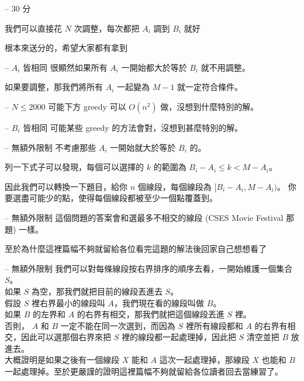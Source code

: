 \documentclass[hyperref,UTF8,notheorems,xcolor={dvipsnames}]{beamer}
\newcommand{\btitle}[1]{{\secname} -- #1}
\theoremstyle{definition}
\begin{document}
\begin{frame}[fragile]{\btitle{30 分}}
	
	我們可以直接花 $N$ 次調整，每次都把 $A_i$ 調到 $B_i$ 就好
	\pause

	根本來送分的，希望大家都有拿到
	
\end{frame}

\begin{frame}[fragile]{\btitle{$A_i$ 皆相同}}
	很顯然如果所有 $A_i$ 一開始都大於等於 $B_i$ 就不用調整。
	\pause

	如果要調整，那我們將所有 $A_i$ 一起變為 $M - 1$ 就一定符合條件。
\end{frame}

\begin{frame}[fragile]{\btitle{$N \le 2000$}}
	可能下方 greedy 可以 $O(n^2)$ 做，沒想到什麼特別的解。

\end{frame}

\begin{frame}[fragile]{\btitle{$B_i$ 皆相同}}
	可能某些 greedy 的方法會對，沒想到甚麼特別的解。
	
\end{frame}

\begin{frame}[fragile]{\btitle{無額外限制}}
	不考慮那些 $A_i$ 一開始就大於等於 $B_i$ 的。

	列一下式子可以發現，每個可以選擇的 $k$ 的範圍為 $B_i - A_i \le k < M - A_i$。 
	\pause 

	因此我們可以轉換一下題目，給你 $n$ 個線段，每個線段為 $[B_i - A_i, M - A_i)$。
	你要選盡可能少的點，使得每個線段都被至少一個點覆蓋到。
\end{frame}

\begin{frame}[fragile]{\btitle{無額外限制}}
	這個問題的答案會和選最多不相交的線段 (CSES Movie Festival 那題) 一樣。

	至於為什麼這裡篇幅不夠就留給各位看完這題的解法後回家自己想想看了
\end{frame}

\begin{frame}[fragile]{\btitle{無額外限制}}
	我們可以對每條線段按右界排序的順序去看，一開始維護一個集合 $S$。  \\
	如果 $S$ 為空，那我們就把目前的線段丟進去 $S$。  \\ \pause
	假設 $S$ 裡右界最小的線段叫 $A$，我們現在看的線段叫做 $B$。  \\ 
	如果 $B$ 的左界和 $A$ 的右界有相交，那我們就把這個線段丟進 $S$ 裡。  \\ \pause
	否則， $A$ 和 $B$ 一定不能在同一次選到，而因為 $S$ 裡所有線段都和 $A$ 的右界有相交，因此可以選那個右界來把 $S$ 裡的線段都一起處理掉，因此把 $S$ 清空並把 $B$ 放進去。  \\ 
	大概證明是如果之後有一個線段 $X$ 能和 $A$ 這次一起處理掉，那線段 $X$ 也能和 $B$ 一起處理掉。至於更嚴謹的證明這裡篇幅不夠就留給各位讀者回去當練習了。
\end{frame}
\end{document}
